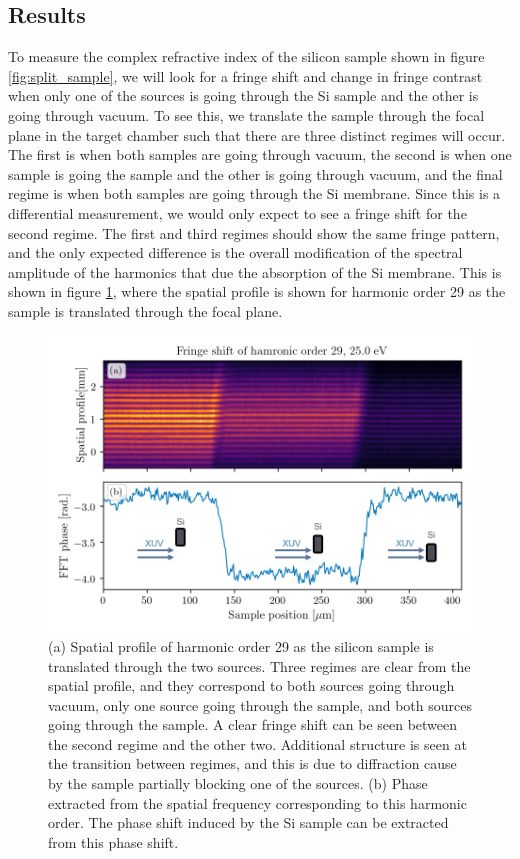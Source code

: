 \subsection{Results}
To measure the complex refractive index of the silicon sample shown in figure \ref{fig:split_sample}, we will look for a fringe shift and change in fringe contrast when only one of the sources is going through the Si sample and the other is going through vacuum.  To see this, we translate the sample through the focal plane in the target chamber such that there are three distinct regimes will occur.  The first is when both samples are going through vacuum, the second is when one sample is going the sample and the other is going through vacuum, and the final regime is when both samples are going through the Si membrane.  Since this is a differential measurement, we would only expect to see a fringe shift for the second regime.  The first and third regimes should show the same fringe pattern, and the only expected difference is the overall modification of the spectral amplitude of the harmonics that due the absorption of the Si membrane.  This is shown in figure \ref{fig:harmonic_phase_shift}, where the spatial profile is shown for harmonic order 29 as the sample is translated through the focal plane.  
\begin{figure}
	\centering
	\includegraphics[width=1.0\textwidth]{figures/refractive_index/harmonic_phase_shift.png}
	\caption[Spatial profile and fringe shift of a harmonic as sample is translated across the two XUV sources]{(a) Spatial profile of harmonic order 29 as the silicon sample is translated through the two sources. Three regimes are clear from the spatial profile, and they correspond to both sources going through vacuum, only one source going through the sample, and both sources going through the sample.  A clear fringe shift can be seen between the second regime and the other two.  Additional structure is seen at the transition between regimes, and this is due to diffraction cause by the sample partially blocking one of the sources. (b) Phase extracted from the spatial frequency corresponding to this harmonic order.  The phase shift induced by the Si sample can be extracted from this phase shift.}
	\label{fig:harmonic_phase_shift}
\end{figure}
